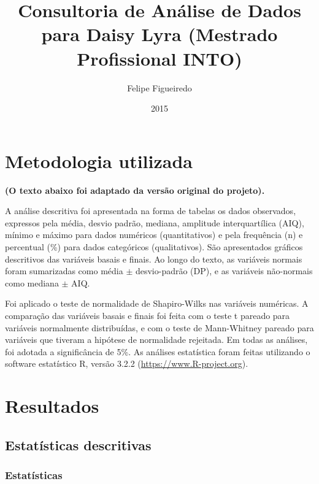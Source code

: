 \documentclass[a4paper]{article}
\author{Felipe Figueiredo}
\title{Consultoria de Análise de Dados para Daisy Lyra (Mestrado Profissional INTO)}
\date{2015}
\begin{document}
\maketitle
\newpage
\tableofcontents
\listoffigures
\listoftables
\newpage
\section{Metodologia utilizada}

{\bf (O texto abaixo foi adaptado da versão original do projeto).}

\bigskip

A análise descritiva foi apresentada na forma de tabelas os dados observados, expressos pela média, desvio padrão, mediana, amplitude interquartílica (AIQ), mínimo e máximo para dados numéricos (quantitativos) e pela frequência (n) e percentual (\%) para dados categóricos (qualitativos). São apresentados gráficos descritivos das variáveis basais e finais. Ao longo do texto, as variáveis normais foram sumarizadas como média $\pm$ desvio-padrão (DP), e as variáveis não-normais como mediana $\pm$ AIQ.



Foi aplicado o teste de normalidade de Shapiro-Wilks nas variáveis numéricas. A comparação das variáveis basais e finais foi feita com o teste t pareado para variáveis normalmente distribuídas,  e com o teste de Mann-Whitney pareado para variáveis que tiveram a hipótese de normalidade rejeitada. Em todas as análises, foi adotada a  significância de 5\%. As análises estatística foram feitas utilizando o software estatístico R, versão 3.2.2 (\url{https://www.R-project.org}).

\section{Resultados}

\subsection{Estatísticas descritivas}

\subsubsection{Estatísticas}
\end{document}
